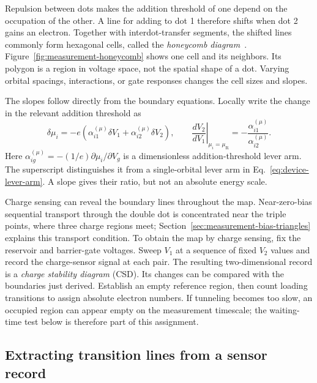 Repulsion between dots makes the addition threshold of one depend
on the occupation of the other. A line for adding to dot 1 therefore
shifts when dot 2 gains an electron. Together with interdot-transfer
segments, the shifted lines commonly form hexagonal cells, called
the \emph{honeycomb diagram}~\cite{VanDerWiel2003}.
Figure~\ref{fig:measurement-honeycomb} shows one cell and its neighbors.
Its polygon is a region in voltage space, not the spatial shape of
a dot. Varying orbital spacings, interactions, or gate responses
changes the cell sizes and slopes.

The slopes follow directly from the boundary equations. Locally
write the change in the relevant addition threshold as
\begin{equation}
 \delta\mu_i=-e(\alpha_{i1}^{(\mu)}\delta V_1
                  +\alpha_{i2}^{(\mu)}\delta V_2),
 \qquad
 \left.\frac{dV_2}{dV_1}\right|_{\mu_i=\mu_{\mathrm R}}
      =-\frac{\alpha_{i1}^{(\mu)}}{\alpha_{i2}^{(\mu)}}.
 \label{eq:measurement-csd-slope}
\end{equation}
Here $\alpha_{ig}^{(\mu)}=-(1/e)\partial\mu_i/\partial V_g$
is a dimensionless addition-threshold lever arm. The superscript
distinguishes it from a single-orbital lever arm in
Eq.~\eqref{eq:device-lever-arm}. A slope gives their ratio, but
not an absolute energy scale.

Charge sensing can reveal the boundary lines throughout the map.
Near-zero-bias sequential transport through the double dot is
concentrated near the triple points, where three charge regions
meet; Section~\ref{sec:measurement-bias-triangles} explains this
transport condition.
To obtain the map by charge sensing, fix the reservoir and barrier-gate voltages.
Sweep $V_1$ at a sequence of fixed $V_2$ values and record the
charge-sensor signal at each pair. The resulting two-dimensional
record is a \emph{charge stability diagram} (CSD). Its changes can
be compared with the boundaries just derived. Establish an empty
reference region, then count loading transitions to assign absolute
electron numbers. If tunneling becomes too slow, an occupied region
can appear empty on the measurement timescale; the waiting-time
test below is therefore part of this assignment.

\subsection{Extracting transition lines from a sensor record}
\label{sec:measurement-charge-scan}

